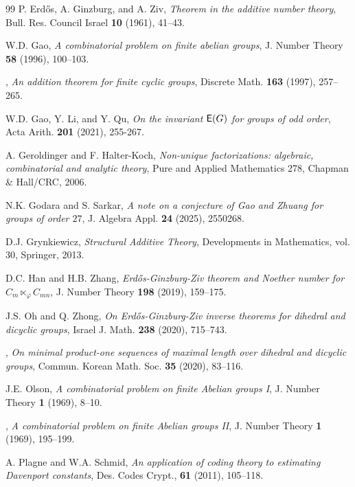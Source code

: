 \documentclass[leqno,a4paper]{amsart}
\theoremstyle{plain}
\theoremstyle{definition}
\numberwithin{equation}{section}
\begin{document}
\begin{thebibliography}{99}
		P. Erd\H{o}s, A. Ginzburg, and A. Ziv,
		{\em Theorem in the additive number theory},
		Bull. Res. Council Israel \textbf{10} (1961), 41--43.
		
		W.D. Gao,
		{\em A combinatorial problem on finite abelian groups},
		J. Number Theory \textbf{58} (1996), 100--103.
		
		\bysame,
		{\em An addition theorem for finite cyclic groups},
		Discrete Math. \textbf{163} (1997), 257--265.
		
		W.D. Gao, Y. Li, and Y. Qu,
		{\em On the invariant ${\sf E}(G)$ for groups of odd order},
		Acta Arith. \textbf{201} (2021), 255-267.
		
		A. Geroldinger and F. Halter-Koch,
		{\em Non-unique factorizations: algebraic, combinatorial and analytic theory},
		Pure and Applied Mathematics 278, Chapman \& Hall/CRC, 2006.
		
		N.K. Godara and S. Sarkar,
		{\em A note on a conjecture of Gao and Zhuang for groups of order $27$},
		J. Algebra Appl. \textbf{24} (2025), 2550268.
		
		D.J. Grynkiewicz,
		{\em Structural Additive Theory},
		Developments in Mathematics, vol. 30, Springer, 2013.
		
		D.C. Han and H.B. Zhang,
		{\em Erd\H{o}s-Ginzburg-Ziv theorem and Noether number for $C_m \ltimes_\varphi C_{mn}$},
		J. Number Theory \textbf{198} (2019), 159--175.
		
		J.S. Oh and Q. Zhong,
		{\em On Erd\H{o}s-Ginzburg-Ziv inverse theorems for dihedral and dicyclic groups},
		Israel J. Math. \textbf{238} (2020), 715--743.
		
        \bysame,
        {\em On minimal product-one sequences of maximal length over dihedral and dicyclic groups},
        Commun. Korean Math. Soc. \textbf{35} (2020), 83--116.

		J.E. Olson,
		{\em A combinatorial problem on finite Abelian groups I},
		J. Number Theory \textbf{1} (1969), 8--10.
		
		\bysame,
		{\em A combinatorial problem on finite Abelian groups II},
		J. Number Theory \textbf{1} (1969), 195--199.
		
		A. Plagne and W.A. Schmid,
		{\em An application of coding theory to estimating Davenport constants},
		Des. Codes Crypt., \textbf{61} (2011), 105--118.
		

\end{thebibliography}
\end{document}
